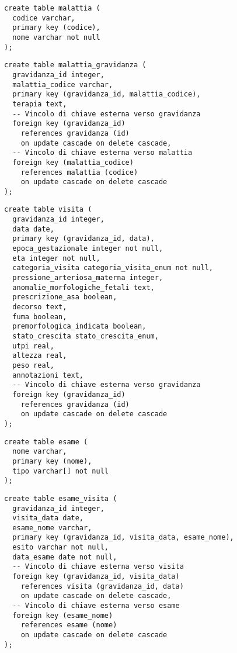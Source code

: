 \begin{lstlisting}[float,caption={Definizione della tabella \tab{malattia}.},label=ptabmalattia]
create table malattia (
  codice varchar,
  primary key (codice),
  nome varchar not null
);
\end{lstlisting}

\begin{lstlisting}[float,caption={Definizione della tabella \tab{malattia\_gravidanza}.},label=ptabmalattiagravidanza]
create table malattia_gravidanza (
  gravidanza_id integer,
  malattia_codice varchar,
  primary key (gravidanza_id, malattia_codice),
  terapia text,
  -- Vincolo di chiave esterna verso gravidanza
  foreign key (gravidanza_id)
    references gravidanza (id)
    on update cascade on delete cascade,
  -- Vincolo di chiave esterna verso malattia
  foreign key (malattia_codice)
    references malattia (codice)
    on update cascade on delete cascade
);
\end{lstlisting}

\begin{lstlisting}[float,caption={Definizione della tabella \tab{visita}.},label=ptabvisita]
create table visita (
  gravidanza_id integer,
  data date,
  primary key (gravidanza_id, data),
  epoca_gestazionale integer not null,
  eta integer not null,
  categoria_visita categoria_visita_enum not null,
  pressione_arteriosa_materna integer,
  anomalie_morfologiche_fetali text,
  prescrizione_asa boolean,
  decorso text,
  fuma boolean,
  premorfologica_indicata boolean,
  stato_crescita stato_crescita_enum,
  utpi real,
  altezza real,
  peso real,
  annotazioni text,
  -- Vincolo di chiave esterna verso gravidanza
  foreign key (gravidanza_id)
    references gravidanza (id)
    on update cascade on delete cascade
);
\end{lstlisting}

\begin{lstlisting}[float,caption={Definizione della tabella \tab{esame}.},label=ptabesame]
create table esame (
  nome varchar,
  primary key (nome),
  tipo varchar[] not null
);
\end{lstlisting}

\begin{lstlisting}[float,caption={Definizione della tabella \tab{esame\_visita}.},label=ptabesamevisita]
create table esame_visita (
  gravidanza_id integer,
  visita_data date,
  esame_nome varchar,
  primary key (gravidanza_id, visita_data, esame_nome),
  esito varchar not null,
  data_esame date not null,
  -- Vincolo di chiave esterna verso visita
  foreign key (gravidanza_id, visita_data)
    references visita (gravidanza_id, data)
    on update cascade on delete cascade,
  -- Vincolo di chiave esterna verso esame
  foreign key (esame_nome)
    references esame (nome)
    on update cascade on delete cascade
);
\end{lstlisting}

